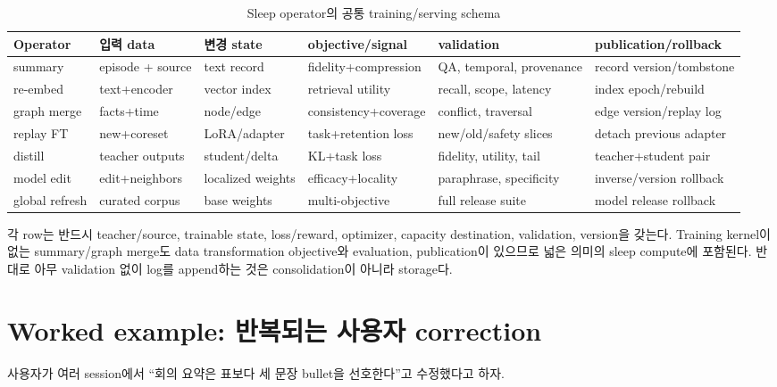 \begin{table}[htbp]
\centering
\caption{Sleep operator의 공통 training/serving schema}
\label{tab:bg-stc-operator-schema}
\scriptsize
\begin{tabularx}{\textwidth}{p{} p{} p{} p{} X X}
\toprule
Operator & 입력 data & 변경 state & objective/signal & validation & publication/rollback \\
\midrule
summary & episode + source & text record & fidelity+compression & QA, temporal, provenance & record version/tombstone \\
re-embed & text+encoder & vector index & retrieval utility & recall, scope, latency & index epoch/rebuild \\
graph merge & facts+time & node/edge & consistency+coverage & conflict, traversal & edge version/replay log \\
replay FT & new+coreset & LoRA/adapter & task+retention loss & new/old/safety slices & detach previous adapter \\
distill & teacher outputs & student/delta & KL+task loss & fidelity, utility, tail & teacher+student pair \\
model edit & edit+neighbors & localized weights & efficacy+locality & paraphrase, specificity & inverse/version rollback \\
global refresh & curated corpus & base weights & multi-objective & full release suite & model release rollback \\
\bottomrule
\end{tabularx}
\end{table}

각 row는 반드시 teacher/source, trainable state, loss/reward, optimizer, capacity destination, validation,
version을 갖는다. Training kernel이 없는 summary/graph merge도 data transformation objective와 evaluation,
publication이 있으므로 넓은 의미의 sleep compute에 포함된다. 반대로 아무 validation 없이 log를
append하는 것은 consolidation이 아니라 storage다.

\section{Worked example: 반복되는 사용자 correction}

사용자가 여러 session에서 ``회의 요약은 표보다 세 문장 bullet을 선호한다''고 수정했다고 하자.

